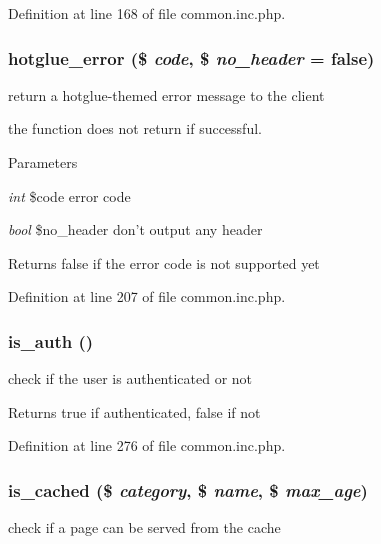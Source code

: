 Definition at line 168 of file common.inc.php.

\hypertarget{common_8inc_8php_a7c4cb31a76aaf90f4399752ef35e00fe}{
\subsubsection[{hotglue\_\-error}]{\setlength{\rightskip}{0pt plus 5cm}hotglue\_\-error (\$ {\em code}, \/  \$ {\em no\_\-header} = {\ttfamily false})}}
\label{common_8inc_8php_a7c4cb31a76aaf90f4399752ef35e00fe}
return a hotglue-\/themed error message to the client

the function does not return if successful. 
\begin{DoxyParams}{Parameters}
\item[{\em int}]\$code error code \item[{\em bool}]\$no\_\-header don't output any header \end{DoxyParams}
\begin{DoxyReturn}{Returns}
false if the error code is not supported yet 
\end{DoxyReturn}


Definition at line 207 of file common.inc.php.

\hypertarget{common_8inc_8php_ab3abbb2cd13e01231533e7cdc93da6db}{
\subsubsection[{is\_\-auth}]{\setlength{\rightskip}{0pt plus 5cm}is\_\-auth ()}}
\label{common_8inc_8php_ab3abbb2cd13e01231533e7cdc93da6db}
check if the user is authenticated or not

\begin{DoxyReturn}{Returns}
true if authenticated, false if not 
\end{DoxyReturn}


Definition at line 276 of file common.inc.php.

\hypertarget{common_8inc_8php_a6fb34b9210b43349ca3eb16b2738a28b}{
\subsubsection[{is\_\-cached}]{\setlength{\rightskip}{0pt plus 5cm}is\_\-cached (\$ {\em category}, \/  \$ {\em name}, \/  \$ {\em max\_\-age})}}
\label{common_8inc_8php_a6fb34b9210b43349ca3eb16b2738a28b}
check if a page can be served from the cache


